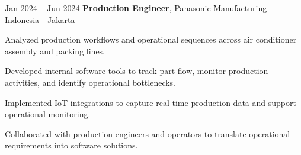 \vspace{0.5 cm}


\begin{twocolentrydate}{Jan 2024 -- Jun 2024}
	\textbf{Production Engineer}, Panasonic Manufacturing Indonesia - Jakarta
\end{twocolentrydate}

\vspace{0.10 cm}


\begin{onecolentry}
	\begin{highlights}
		\item Analyzed production workflows and operational sequences across air conditioner assembly and packing lines.
		\item Developed internal software tools to track part flow, monitor production activities, and identify operational bottlenecks.
		\item Implemented IoT integrations to capture real-time production data and support operational monitoring.
		\item Collaborated with production engineers and operators to translate operational requirements into software solutions.
	\end{highlights}
\end{onecolentry}
